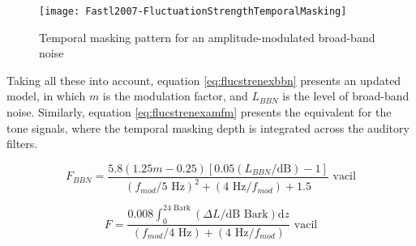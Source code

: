 \begin{figure}
    \centering
    \texttt{[image: Fastl2007-FluctuationStrengthTemporalMasking]}
    \caption{Temporal masking pattern for an amplitude-modulated broad-band
        noise \cite[pp. 255]{Fastl2007Psychoacoustics}}
    \label{fig:flucstrenmasking}
\end{figure}

Taking all these into account, equation \ref{eq:flucstrenexbbn} presents an
updated model, in which $m$ is the modulation factor, and $L_{BBN}$ is the level
of broad-band noise. Similarly, equation \ref{eq:flucstrenexamfm} presents the
equivalent for the tone signals, where the temporal masking depth is integrated
across the auditory filters.

\begin{equation}
    F_{BBN} = \frac{5.8(1.25m-0.25)[0.05(L_{BBN}/\text{dB})-1]}
        {(f_{mod}/5\text{ Hz})^2+(4\text{ Hz}/f_{mod})+1.5} \text{ vacil}
    \label{eq:flucstrenexbbn}
\end{equation}

\begin{equation}
    F = \frac{0.008 \int_0^{24\text{ Bark}}(\Delta L/\text{dB Bark})\mathrm{d}z}
        {(f_{mod}/4\text{ Hz})+(4\text{ Hz}/f_{mod})} \text{ vacil}
    \label{eq:flucstrenexamfm}
\end{equation}
